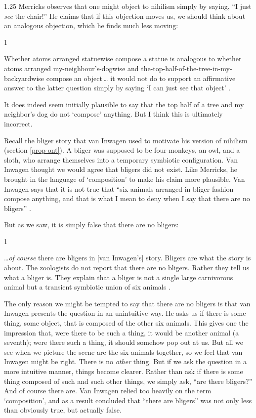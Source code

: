 \documentclass[11pt]{article}
\newenvironment{squote}{%
\begin{spacing}{1}
       	\begin{list}{}{%
\setlength{\labelwidth}{0pt}%
\rightmargin\leftmargin%
}
\item\relax
}{%
\end{list}%
\end{spacing}
}
\begin{document}
\begin{spacing}{1.25}
Merricks observes that one might object to nihilism simply by saying,
``I just {\em see} the chair!''  He claims that if this objection
moves us, we should think about an analogous objection, which he finds
much less moving:

\begin{squote}
Whether atoms arranged statuewise compose a statue is analogous to
whether atoms arranged my-neighbour's-dogwise and
the-top-half-of-the-tree-in-my-backyardwise compose an object\,\ldots
it would not do to support an affirmative answer to the latter
question simply by saying `I can just see that object'
\citeyearpar[73]{merricks2001a}.
\end{squote}

It does indeed seem initially plausible to say that the top half of a
tree and my neighbor's dog do not `compose' anything.  But I think
this is ultimately incorrect.

Recall the bliger story that van Inwagen used to motivate his version
of nihilism (section \ref{prop-ont}).  A bliger was supposed to be
four monkeys, an owl, and a sloth, who arrange themselves into a
temporary symbiotic configuration.  Van Inwagen thought we would agree
that bligers did not exist.  Like Merricks, he brought in the language
of `composition' to make his claim more plausible.  Van Inwagen says
that it is not true that ``six animals arranged in bliger fashion
compose anything, and that is what I mean to deny when I say that
there are no bligers'' \citeyearpar[104]{inwagen1995}.

But as we saw, it is simply false that there are no bligers:

\begin{squote}
\ldots {\em of course} there are bligers in [van Inwagen's] story.
Bligers are what the story is about.  The zoologists do not report
that there are no bligers.  Rather they tell us what a bliger is.
They explain that a bliger is not a single large carnivorous animal
but a transient symbiotic union of six animals
\citep[704]{rosenberg1993}.
\end{squote}

The only reason we might be tempted to say that there are no bligers
is that van Inwagen presents the question in an unintuitive way.  He
asks us if there is some thing, some object, that is composed of the
other six animals.  This gives one the impression that, were there to
be such a thing, it would be another animal (a seventh); were there
such a thing, it should somehow pop out at us.  But all we see when we
picture the scene are the six animals together, so we feel that van
Inwagen might be right.  There is no {\em other} thing.  But if we ask
the question in a more intuitive manner, things become clearer.
Rather than ask if there is some thing composed of such and such other
things, we simply ask, ``are there bligers?''  And of course there
are.  Van Inwagen relied too heavily on the term `composition', and as
a result concluded that ``there are bligers'' was not only less than
obviously true, but actually false.


\end{spacing}
\end{document}
